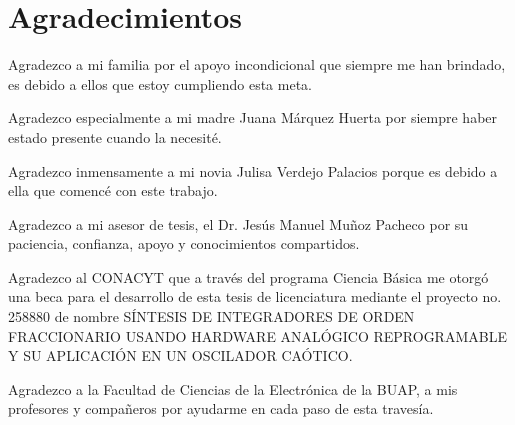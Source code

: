 \chapter{Agradecimientos}

Agradezco a mi familia por el apoyo incondicional que siempre me han brindado, es debido a ellos que estoy cumpliendo esta meta.

Agradezco especialmente a mi madre Juana Márquez Huerta por siempre haber estado presente cuando la necesité.

Agradezco inmensamente a mi novia Julisa Verdejo Palacios porque es debido a ella que comencé con este trabajo.

Agradezco a mi asesor de tesis, el Dr. Jesús Manuel Muñoz Pacheco por su paciencia, confianza, apoyo y conocimientos compartidos.

Agradezco al CONACYT que a través del programa Ciencia Básica me otorgó una beca para el desarrollo de esta tesis de licenciatura mediante el proyecto no. 258880 de nombre SÍNTESIS DE INTEGRADORES DE ORDEN FRACCIONARIO USANDO HARDWARE ANALÓGICO REPROGRAMABLE Y SU APLICACIÓN EN UN OSCILADOR CAÓTICO.

Agradezco a la Facultad de Ciencias de la Electrónica de la BUAP, a mis profesores y compañeros por ayudarme en cada paso de esta travesía.

